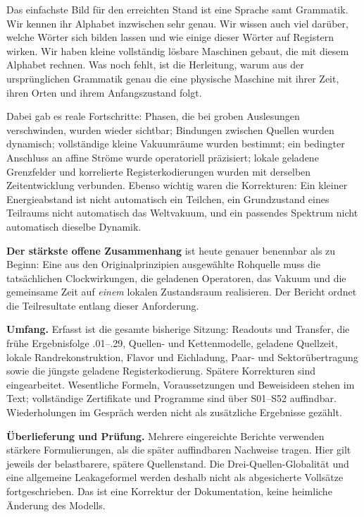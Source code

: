 Das einfachste Bild für den erreichten Stand ist eine Sprache samt Grammatik. Wir kennen ihr Alphabet inzwischen sehr genau. Wir wissen auch viel darüber, welche Wörter sich bilden lassen und wie einige dieser Wörter auf Registern wirken. Wir haben kleine vollständig lösbare Maschinen gebaut, die mit diesem Alphabet rechnen. Was noch fehlt, ist die Herleitung, warum aus der ursprünglichen Grammatik genau die eine physische Maschine mit ihrer Zeit, ihren Orten und ihrem Anfangszustand folgt.

Dabei gab es reale Fortschritte: Phasen, die bei groben Auslesungen verschwinden, wurden wieder sichtbar; Bindungen zwischen Quellen wurden dynamisch; vollständige kleine Vakuumräume wurden bestimmt; ein bedingter Anschluss an affine Ströme wurde operatoriell präzisiert; lokale geladene Grenzfelder und korrelierte Registerkodierungen wurden mit derselben Zeitentwicklung verbunden. Ebenso wichtig waren die Korrekturen: Ein kleiner Energieabstand ist nicht automatisch ein Teilchen, ein Grundzustand eines Teilraums nicht automatisch das Weltvakuum, und ein passendes Spektrum nicht automatisch dieselbe Dynamik.

\textbf{Der stärkste offene Zusammenhang} ist heute genauer benennbar als zu Beginn: Eine aus den Originalprinzipien ausgewählte Rohquelle muss die tatsächlichen Clockwirkungen, die geladenen Operatoren, das Vakuum und die gemeinsame Zeit auf \emph{einem} lokalen Zustandsraum realisieren. Der Bericht ordnet die Teilresultate entlang dieser Anforderung.

\textbf{Umfang.} Erfasst ist die gesamte bisherige Sitzung: Readouts und Transfer, die frühe Ergebnisfolge .01--.29, Quellen- und Kettenmodelle, geladene Quellzeit, lokale Randrekonstruktion, Flavor und Eichladung, Paar- und Sektorübertragung sowie die jüngste geladene Registerkodierung. Spätere Korrekturen sind eingearbeitet. Wesentliche Formeln, Voraussetzungen und Beweisideen stehen im Text; vollständige Zertifikate und Programme sind über S01--S52 auffindbar. Wiederholungen im Gespräch werden nicht als zusätzliche Ergebnisse gezählt.

\textbf{Überlieferung und Prüfung.} Mehrere eingereichte Berichte verwenden stärkere Formulierungen, als die später auffindbaren Nachweise tragen. Hier gilt jeweils der belastbarere, spätere Quellenstand. Die Drei-Quellen-Globalität und eine allgemeine Leakageformel werden deshalb nicht als abgesicherte Vollsätze fortgeschrieben. Das ist eine Korrektur der Dokumentation, keine heimliche Änderung des Modells.
\tableofcontents
\clearpage
{}
